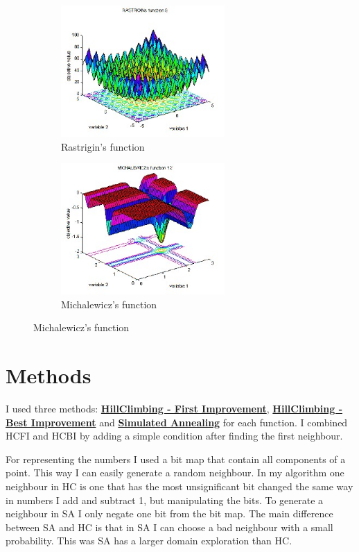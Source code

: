 \documentclass[12pt]{article}
\begin{document}
\begin{center}
\begin{figure}
    \begin{subfigure}{0.5\textwidth}
    \includegraphics[width=0.9\linewidth, height=5cm]{rastrigin.jpg} 
    \caption{Rastrigin's function}
    \label{fig:subim3}
    \end{subfigure}
    \begin{subfigure}{0.5\textwidth}
    \includegraphics[width=0.9\linewidth, height=5cm]{michalenwicz.jpg}
    \caption{Michalewicz's function}
    \label{fig:subim2}
    \end{subfigure}
    
  \end{figure}
  
\end{center}






\section{Methods}
 
I used three methods: \href{https://en.wikipedia.org/wiki/Hill_climbing}{\textbf{HillClimbing - First Improvement}}, \href{https://en.wikipedia.org/wiki/Hill_climbing}{\textbf{HillClimbing - Best Improvement}} and 
\href{ttps://en.wikipedia.org/wiki/Simulated_annealing}{\textbf{Simulated Annealing}} for each function. I combined HCFI and HCBI by adding a simple condition after finding the first neighbour.

For representing the numbers I used a bit map that contain all components of a point. This way I can easily generate a random neighbour. In my algorithm one neighbour in HC is one that has the most unsignificant bit changed
the same way in numbers I add and subtract 1, but manipulating the bits. To generate a neighbour in SA I only negate one bit from the bit map. The main difference between SA and HC is that in SA I can choose a bad neighbour with a small probability.
This was SA has a larger domain exploration than HC.
\end{document}
